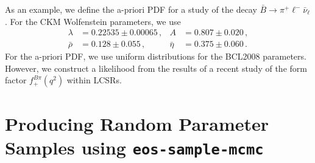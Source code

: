 As an example, we define the a-priori \gls{PDF} for a study of the decay $\bar{B}\to \pi^+\ell^-\bar\nu_\ell$.
For the CKM Wolfenstein parameters, we use
\begin{equation*}
\begin{aligned}
    \lambda    & = 0.22535 \pm 0.00065\,,  &
    A          & = 0.807 \pm 0.020\,,      \\
    \bar{\rho} & = 0.128 \pm 0.055\,,      &
    \bar{\eta} & = 0.375 \pm 0.060\,.
\end{aligned}
\end{equation*}
For the a-priori \gls{PDF}, we use uniform distributions for the BCL2008 \cite{Bourrely:2008za}
parameters. However, we construct a likelihood from the results of a recent study of the form factor
$f^{B\pi}_+(q^2)$ within \glspl{LCSR}. 


\section{Producing Random Parameter Samples using \textbf{\texttt{eos-sample-mcmc}}}
\label{sec:usage:eos-sample-mcmc}

